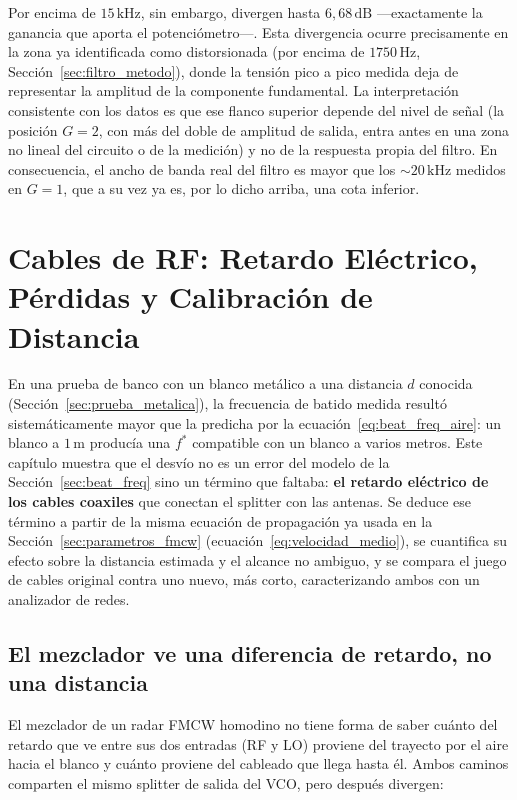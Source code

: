 \documentclass[12pt, a4paper, twoside]{report}
\begin{document}
Por encima de $15\,\text{kHz}$, sin embargo, divergen hasta
$6{,}68\,\text{dB}$ —exactamente la ganancia que aporta el
potenciómetro—. Esta divergencia ocurre precisamente en la zona ya
identificada como distorsionada (por encima de $1750\,\text{Hz}$,
Sección~\ref{sec:filtro_metodo}), donde la tensión pico a pico
medida deja de representar la amplitud de la componente fundamental.
La interpretación consistente con los datos es que ese flanco
superior depende del nivel de señal (la posición $G=2$, con más del
doble de amplitud de salida, entra antes en una zona no lineal del
circuito o de la medición) y no de la respuesta propia del filtro. En
consecuencia, el ancho de banda real del filtro es mayor que los
$\sim\!20\,\text{kHz}$ medidos en $G=1$, que a su vez ya es, por lo
dicho arriba, una cota inferior.

\chapter{Cables de RF: Retardo Eléctrico, Pérdidas y Calibración
  de Distancia}
\label{ch:cables}

En una prueba de banco con un blanco metálico a una distancia $d$
conocida (Sección~\ref{sec:prueba_metalica}), la frecuencia de batido
medida resultó sistemáticamente mayor que la predicha por la
ecuación~\eqref{eq:beat_freq_aire}: un blanco a $1\,\text{m}$ producía
una $f^*$ compatible con un blanco a varios metros. Este capítulo
muestra que el desvío no es un error del modelo de la
Sección~\ref{sec:beat_freq} sino un término que faltaba: \textbf{el
retardo eléctrico de los cables coaxiles} que conectan el splitter con
las antenas. Se deduce ese
término a partir de la misma ecuación de propagación ya usada en la
Sección~\ref{sec:parametros_fmcw}
(ecuación~\eqref{eq:velocidad_medio}), se cuantifica su efecto sobre la
distancia estimada y el alcance no ambiguo, y se compara el juego de
cables original contra uno nuevo, más corto, caracterizando ambos con
un analizador de redes.

\section{El mezclador ve una diferencia de retardo, no una distancia}
\label{sec:cables_diferencia_retardo}

El mezclador de un radar FMCW homodino no tiene forma de saber cuánto
del retardo que ve entre sus dos entradas (RF y LO) proviene del
trayecto por el aire hacia el blanco y cuánto proviene del cableado que
llega hasta él. Ambos caminos comparten el mismo splitter de salida del
VCO, pero después divergen:
\end{document}

